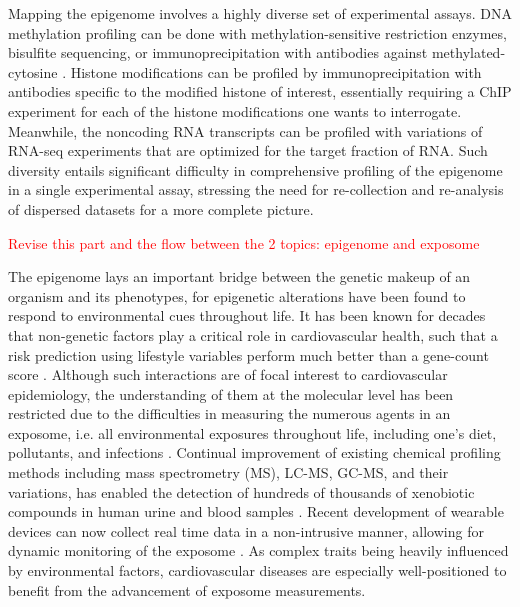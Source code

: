 \documentclass[letter]{bioinfo}
\newcommand{\comment}[1]{\textcolor{red}{#1}}
\begin{document}
	
	Mapping the epigenome involves a highly diverse set of experimental assays. DNA methylation profiling can be done with methylation-sensitive restriction enzymes, bisulfite sequencing, or immunoprecipitation with antibodies against methylated-cytosine \citep{Bibikova:2010:Genomewide}. Histone modifications can be profiled by immunoprecipitation with antibodies specific to the modified histone of interest, essentially requiring a ChIP experiment for each of the histone modifications one wants to interrogate. Meanwhile, the noncoding RNA transcripts can be profiled with variations of RNA-seq experiments that are optimized for the target fraction of RNA. Such diversity entails significant difficulty in comprehensive profiling of the epigenome in a single experimental assay, stressing the need for re-collection and re-analysis of dispersed datasets for a more complete picture.
	
	\comment{Revise this part and the flow between the 2 topics: epigenome and exposome}
	
	The epigenome lays an important bridge between the genetic makeup of an organism and its phenotypes, for epigenetic alterations have been found to respond to environmental cues throughout life.
	It has been known for decades that non-genetic factors play a critical role in cardiovascular health, such that a risk prediction using lifestyle variables perform much better than a gene-count score \citep{Joyner:2011:Ten}. Although such interactions are of focal interest to cardiovascular epidemiology,  the understanding of them at the molecular level has been restricted due to the difficulties in measuring the numerous agents in an exposome, i.e. all environmental exposures throughout life, including one's diet, pollutants, and infections \citep{Wild:2005:Complementing}. Continual improvement of existing chemical profiling methods including mass spectrometry (MS), LC-MS, GC-MS, and their variations, has enabled the detection of hundreds of thousands of xenobiotic compounds in human urine and blood samples \citep{Warth:2017:ExposomeScale}.
	Recent development of wearable devices can now collect real time data in a non-intrusive manner, allowing for dynamic monitoring of the exposome \citep{Jiang:2018:Dynamic}. As complex traits being heavily influenced by environmental factors, cardiovascular diseases are especially well-positioned to benefit from the advancement of exposome measurements.
	
\end{document}
